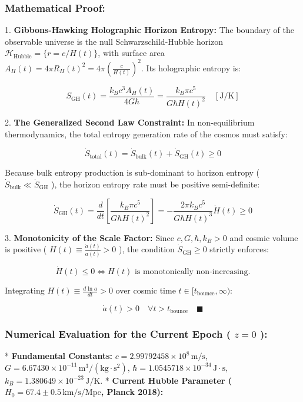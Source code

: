 \documentclass[11pt,a4paper]{article}
\theoremstyle{definition}
\theoremstyle{remark}
\begin{document}
\subsubsection{Mathematical Proof:}
1. \textbf{Gibbons-Hawking Holographic Horizon Entropy:}
The boundary of the observable universe is the null Schwarzschild-Hubble horizon $\mathcal{H}_{\text{Hubble}} = \{ r = c/H(t) \}$, with surface area $A_H(t) = 4\pi R_H(t)^2 = 4\pi \left(\frac{c}{H(t)}\right)^2$. Its holographic entropy is:


\begin{equation}
S_{\text{GH}}(t) = \frac{k_B c^3 A_H(t)}{4 G \hbar} = \frac{k_B \pi c^5}{G \hbar H(t)^2} \quad [\mathrm{J/K}]
\end{equation}


2. \textbf{The Generalized Second Law Constraint:}
In non-equilibrium thermodynamics, the total entropy generation rate of the cosmos must satisfy:


\begin{equation}
\dot{S}_{\text{total}}(t) = \dot{S}_{\text{bulk}}(t) + \dot{S}_{\text{GH}}(t) \ge 0
\end{equation}


Because bulk entropy production is sub-dominant to horizon entropy ( $\dot{S}_{\text{bulk}} \ll \dot{S}_{\text{GH}}$ ), the horizon entropy rate must be positive semi-definite:


\begin{equation}
\dot{S}_{\text{GH}}(t) = \frac{d}{dt}[ \frac{k_B \pi c^5}{G \hbar H(t)^2} ] = -\frac{2\pi k_B c^5}{G \hbar H(t)^3} \dot{H}(t) \ge 0
\end{equation}


3. \textbf{Monotonicity of the Scale Factor:}
Since $c, G, \hbar, k_B > 0$ and cosmic volume is positive ( $H(t) \equiv \frac{\dot{a}(t)}{a(t)} > 0$ ), the condition $\dot{S}_{\text{GH}} \ge 0$ strictly enforces:


\begin{equation}
\dot{H}(t) \le 0 \iff H(t) \text{ is monotonically non-increasing.}
\end{equation}


Integrating $H(t) \equiv \frac{d \ln a}{dt} > 0$ over cosmic time $t \in [t_{\text{bounce}}, \infty)$:


\begin{equation}
\boxed{\dot{a}(t) > 0 \quad \forall t > t_{\text{bounce}} \quad \blacksquare}
\end{equation}


\subsubsection{Numerical Evaluation for the Current Epoch ( $z = 0$ ):}
* \textbf{Fundamental Constants:}
$c = 2.99792458 \times 10^8 \, \mathrm{m/s}$, $G = 6.67430 \times 10^{-11} \, \mathrm{m^3/(kg \cdot s^2)}$, $\hbar = 1.0545718 \times 10^{-34} \, \mathrm{J \cdot s}$, $k_B = 1.380649 \times 10^{-23} \, \mathrm{J/K}$.
* \textbf{Current Hubble Parameter ( $H_0 = 67.4 \pm 0.5 \, \mathrm{km/s/Mpc}$, Planck 2018):}
\end{document}
